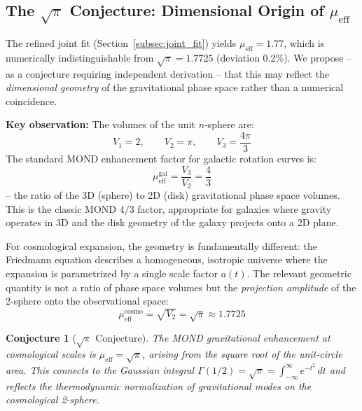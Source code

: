 \documentclass[aps,prd,twocolumn,superscriptaddress,nofootinbib,floatfix]{revtex4-2}
\newtheorem{conjecture}{Conjecture}
\begin{document}
\subsection{The \texorpdfstring{$\sqrt{\pi}$}{sqrt(pi)} Conjecture: Dimensional Origin of \texorpdfstring{$\mu_{\mathrm{eff}}$}{mu\_eff}}
\label{subsec:sqrt_pi}

The refined joint fit (Section~\ref{subsec:joint_fit}) yields $\mu_{\mathrm{eff}} = 1.77$, which is numerically indistinguishable from $\sqrt{\pi} = 1.7725$ (deviation 0.2\%). We propose -- as a conjecture requiring independent derivation -- that this may reflect the \textit{dimensional geometry} of the gravitational phase space rather than a numerical coincidence.

\textbf{Key observation:} The volumes of the unit $n$-sphere are:
\begin{equation}
V_1 = 2, \qquad V_2 = \pi, \qquad V_3 = \frac{4\pi}{3}
\end{equation}
The standard MOND enhancement factor for galactic rotation curves is:
\begin{equation}
\mu_{\mathrm{eff}}^{\mathrm{gal}} = \frac{V_3}{V_2} = \frac{4}{3}
\label{eq:mu_gal}
\end{equation}
-- the ratio of the 3D (sphere) to 2D (disk) gravitational phase space volumes. This is the classic MOND $4/3$ factor, appropriate for galaxies where gravity operates in 3D and the disk geometry of the galaxy projects onto a 2D plane.

For cosmological expansion, the geometry is fundamentally different: the Friedmann equation describes a homogeneous, isotropic universe where the expansion is parametrized by a single scale factor $a(t)$. The relevant geometric quantity is not a ratio of phase space volumes but the \textit{projection amplitude} of the 2-sphere onto the observational space:
\begin{equation}
\mu_{\mathrm{eff}}^{\mathrm{cosmo}} = \sqrt{V_2} = \sqrt{\pi} \approx 1.7725
\label{eq:mu_cosmo}
\end{equation}

\begin{conjecture}[$\sqrt{\pi}$ Conjecture]
The MOND gravitational enhancement at cosmological scales is $\mu_{\mathrm{eff}} = \sqrt{\pi}$, arising from the square root of the unit-circle area. This connects to the Gaussian integral $\Gamma(1/2) = \sqrt{\pi} = \int_{-\infty}^{\infty} e^{-t^2}\,dt$ and reflects the thermodynamic normalization of gravitational modes on the cosmological 2-sphere.
\end{conjecture}
\end{document}
